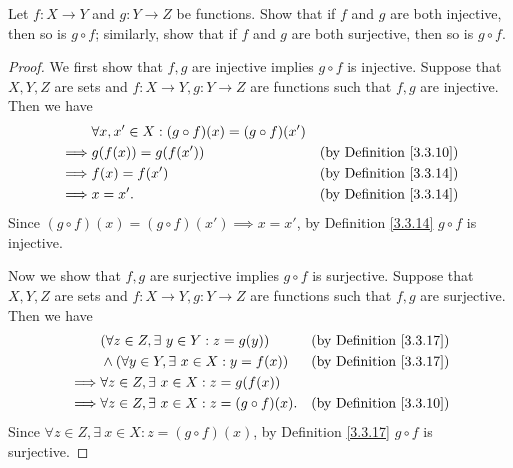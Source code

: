 \begin{exercise}\label{ex 3.3.2}
    Let \(f : X \to Y\) and \(g : Y \to Z\) be functions.
    Show that if \(f\) and \(g\) are both injective, then so is \(g \circ f\);
    similarly, show that if \(f\) and \(g\) are both surjective, then so is \(g \circ f\).
\end{exercise}

\begin{proof}
    We first show that \(f, g\) are injective implies \(g \circ f\) is injective.
    Suppose that \(X, Y, Z\) are sets and \(f : X \to Y, g : Y \to Z\) are functions such that \(f, g\) are injective.
    Then we have
    \begin{align*}
                 & \forall x, x' \in X : (g \circ f)(x) = (g \circ f)(x')                                       \\
        \implies & g(f(x)) = g(f(x'))                                     & \text{(by Definition \ref{3.3.10})} \\
        \implies & f(x) = f(x')                                           & \text{(by Definition \ref{3.3.14})} \\
        \implies & x = x'.                                                & \text{(by Definition \ref{3.3.14})}
    \end{align*}
    Since \((g \circ f)(x) = (g \circ f)(x') \implies x = x'\), by Definition \ref{3.3.14} \(g \circ f\) is injective.

    Now we show that \(f, g\) are surjective implies \(g \circ f\) is surjective.
    Suppose that \(X, Y, Z\) are sets and \(f : X \to Y, g : Y \to Z\) are functions such that \(f, g\) are surjective.
    Then we have
    \begin{align*}
                 & (\forall z \in Z, \exists\ y \in Y : z = g(y))          & \text{(by Definition \ref{3.3.17})} \\
                 & \land (\forall y \in Y, \exists\ x \in X : y = f(x))    & \text{(by Definition \ref{3.3.17})} \\
        \implies & \forall z \in Z, \exists\ x \in X : z = g(f(x))                                               \\
        \implies & \forall z \in Z, \exists\ x \in X : z = (g \circ f)(x). & \text{(by Definition \ref{3.3.10})}
    \end{align*}
    Since \(\forall z \in Z, \exists\ x \in X : z = (g \circ f)(x)\), by Definition \ref{3.3.17} \(g \circ f\) is surjective.
\end{proof}

